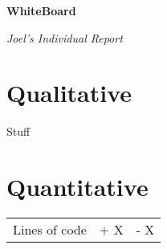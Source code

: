 \documentclass[12 pt]{article}
\begin{document}
\begin{center}

    \huge{\textbf{WhiteBoard}}

    \huge{\textit{Joel's Individual Report}}

\end{center}

\vspace{10 pt}

\section{Qualitative}

Stuff

\section{Quantitative}

\begin{tabular}{ccc}
    Lines of code&+ X&- X\\
\end{tabular}
\end{document}
